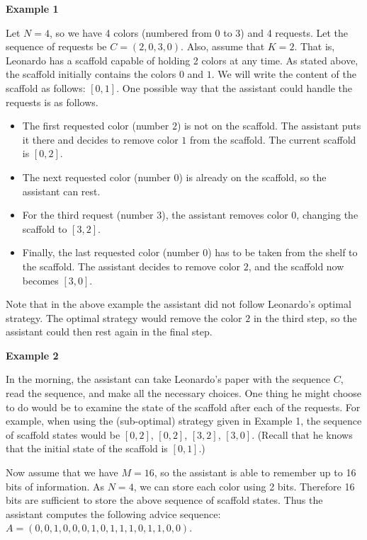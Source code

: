 \bf{Example 1}

Let $N = 4$, so we have 4 colors (numbered from $0$ to $3$) and 4 requests. Let the sequence of requests be $C = (2, 0, 3, 0).$ Also, assume that $K = 2$. That is, Leonardo has a scaffold capable of holding 2 colors at any time. As stated above, the scaffold initially contains the colors $0$ and $1$. We will write the content of the scaffold as follows: $[0, 1]$. One possible way that the assistant could handle the requests is as follows.

\begin{itemize}

\item The first requested color (number $2$) is not on the scaffold. The assistant puts it there and decides to remove color $1$ from the scaffold. The current scaffold is $[0, 2]$.

\item The next requested color (number $0$) is already on the scaffold, so the assistant can rest.

\item For the third request (number $3$), the assistant removes color 0, changing the scaffold to $[3, 2]$.

\item Finally, the last requested color (number $0$) has to be taken from the shelf to the scaffold. The assistant decides to remove color $2$, and the scaffold now becomes $[3, 0]$.

\end{itemize}

Note that in the above example the assistant did not follow Leonardo's optimal strategy. The optimal strategy would remove the color $2$ in the third step, so the assistant could then rest again in the final step.

\bf{Example 2}

In the morning, the assistant can take Leonardo's paper with the sequence $C$, read the sequence, and make all the necessary choices. One thing he might choose to do would be to examine the state of the scaffold after each of the requests. For example, when using the (sub-optimal) strategy given in Example 1, the sequence of scaffold states would be $[0, 2]$, $[0, 2]$, $[3, 2]$, $[3, 0]$. (Recall that he knows that the initial state of the scaffold is $[0, 1]$.) 

Now assume that we have $M = 16$, so the assistant is able to remember up to 16 bits of information. As $N = 4$, we can store each color using 2 bits. Therefore 16 bits are sufficient to store the above sequence of scaffold states. Thus the assistant computes the following advice sequence: $A = (0, 0, 1, 0, 0, 0, 1, 0, 1, 1, 1, 0, 1, 1, 0, 0)$.

